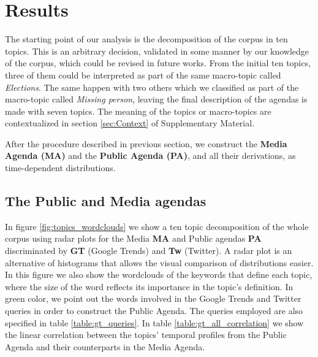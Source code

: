 \documentclass[a4paper, 12pt]{article}
\begin{document}

\section{Results}

\par The starting point of our analysis is the decomposition of the corpus in ten topics. This is an arbitrary decision, validated in some manner by our knowledge of the corpus, which could be revised in future works.  From the initial ten topics, three of them could be interpreted as part of the same macro-topic called \emph{Elections}. The same happen with two others which we classified as part of the macro-topic called \emph{Missing person}, leaving the  final description of the agendas is made with seven topics. The meaning of the topics or macro-topics are contextualized  in section \ref{sec:Context} of Supplementary Material. 

After the procedure described in previous section, we construct the \textbf{Media Agenda (MA)} and the \textbf{Public Agenda (PA)}, and all their derivations, as time-dependent distributions. 

\subsection{The Public and Media agendas}

\par In figure \ref{fig:topics_wordclouds} we show a ten topic decomposition of the whole corpus using radar plots for the Media \textbf{MA} and Public agendas \textbf{PA} discriminated by \textbf{GT} (Google Trends) and \textbf{Tw} (Twitter). A radar plot is an alternative of histograms that allows the visual comparison of distributions easier.
In this figure we also show the wordclouds of the keywords that define each topic, where the size of the word reflects its importance in the topic's definition. In green color, we point out the words involved in the Google Trends and Twitter queries in order to construct the Public Agenda. The queries employed are also specified in table \ref{table:gt_queries}. In table \ref{table:gt_all_correlation} we show the linear correlation between the topics' temporal profiles from the Public Agenda and their counterparts in the Media Agenda.
\end{document}
